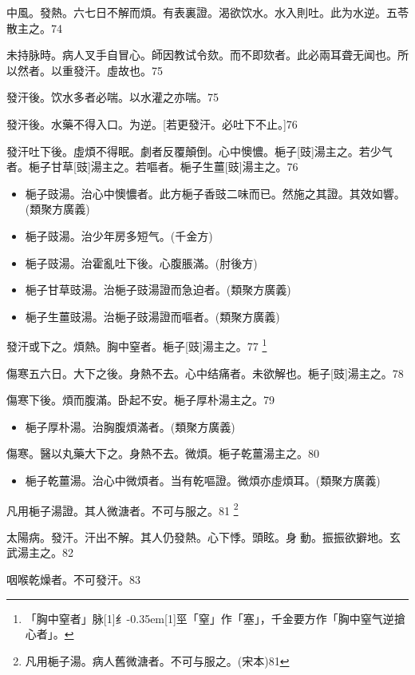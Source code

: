 \documentclass[11pt,oneside,b5paper]{ctexbook}
\begin{document}
\begin{flushleft}
中風。發熱。六七日不解而煩。有表裏證。渴欲饮水。水入則吐。此为水逆。五苓散主之。74

未持脉時。病人叉手自冒心。師因教试令欬。而不即欬者。此必兩耳聋无闻也。所以然者。以重發汗。虛故也。75

發汗後。饮水多者必喘。以水灌之亦喘。75

發汗後。水藥不得入口。为逆。[若更發汗。必吐下不止。]76

發汗吐下後。虛煩不得眠。劇者反覆顛倒。心中懊憹。梔子[豉]湯主之。若少气者。梔子甘草[豉]湯主之。若嘔者。梔子生薑[豉]湯主之。76

\begin{itemize}
\item 梔子豉湯。治心中懊憹者。此方梔子香豉二味而已。然施之其證。其效如響。(類聚方廣義)
\item 梔子豉湯。治少年房多短气。(千金方)
\item 梔子豉湯。治霍亂吐下後。心腹脹滿。(肘後方)
\item 梔子甘草豉湯。治梔子豉湯證而急迫者。(類聚方廣義)
\item 梔子生薑豉湯。治梔子豉湯證而嘔者。(類聚方廣義)
\end{itemize}

發汗或下之。煩熱。胸中窒者。梔子[豉]湯主之。77
\footnote{「胸中窒者」脉{\hbox{\scalebox{0.68}[1]{纟}\kern-0.35em\scalebox{0.64}[1]{巠}}}「窒」作「塞」，千金要方作「胸中窒气逆搶心者」。}

傷寒五六日。大下之後。身熱不去。心中结痛者。未欲解也。梔子[豉]湯主之。78

傷寒下後。煩而腹滿。卧起不安。梔子厚朴湯主之。79

\begin{itemize}
\item 梔子厚朴湯。治胸腹煩滿者。(類聚方廣義)
\end{itemize}

傷寒。醫以丸藥大下之。身熱不去。微煩。梔子乾薑湯主之。80

\begin{itemize}
\item 梔子乾薑湯。治心中微煩者。当有乾嘔證。微煩亦虛煩耳。(類聚方廣義)
\end{itemize}

凡用梔子湯證。其人微溏者。不可与服之。81
\footnote{凡用梔子湯。病人舊微溏者。不可与服之。(宋本)81}

太陽病。發汗。汗出不解。其人仍發熱。心下悸。頭眩。身{𥆧}動。振振欲擗地。玄武湯主之。82

咽喉乾燥者。不可發汗。83


\end{flushleft}
\end{document}
